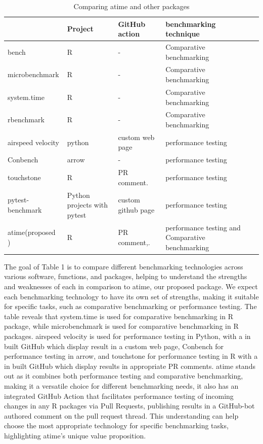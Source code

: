 \begin{table}[H]
    \centering
        \caption{Comparing atime and other packages}
    \begin{tabular}{|m{2.6cm}|m{2cm}|m{3cm}|m{3cm}|m{4cm}|}
    \hline
         & Project & GitHub action & benchmarking technique\\
\hline
bench & R  & - &  Comparative benchmarking \\

\hline
microbenchmark & R & - & Comparative benchmarking\\
\hline
system.time & R & - & Comparative benchmarking\\
\hline
rbenchmark & R & - & Comparative benchmarking\\
\hline
airspeed velocity & python  &  custom web page & performance testing\\
\hline
Conbench & arrow  & - & performance testing\\
\hline
touchstone & R& PR comment. & performance testing\\
\hline
pytest-benchmark & Python
projects with
pytest &  custom github page & performance testing\\
\hline
atime(proposed )  & R  & PR comment,. & performance testing and Comparative benchmarking\\
\hline
    \end{tabular}
    \label{tab:my_label}
\end{table}

\noindent The goal of Table 1 is to compare different benchmarking technologies across various software, functions, and packages, helping to understand the strengths and weaknesses of each in comparison to atime, our proposed package. We expect each benchmarking technology to have its own set of strengths, making it suitable for specific tasks, such as comparative benchmarking or performance testing. The table reveals that system.time is used for comparative benchmarking in R package, while microbenchmark is used for comparative benchmarking in R packages. airspeed velocity is used for performance testing in Python, with a in built GitHub which display result in a custom web page, Conbench for performance testing in arrow, and touchstone for performance testing in R with a in built GitHub which display results in appropriate PR comments. atime stands out as it combines both performance testing and comparative benchmarking, making it a versatile choice for different benchmarking needs, it also has an integrated GitHub Action that facilitates performance testing of incoming changes in any R packages via Pull Requests, publishing results in a GitHub-bot authored comment on the pull request thread. This understanding can help choose the most appropriate technology for specific benchmarking tasks, highlighting atime's unique value proposition.\\



